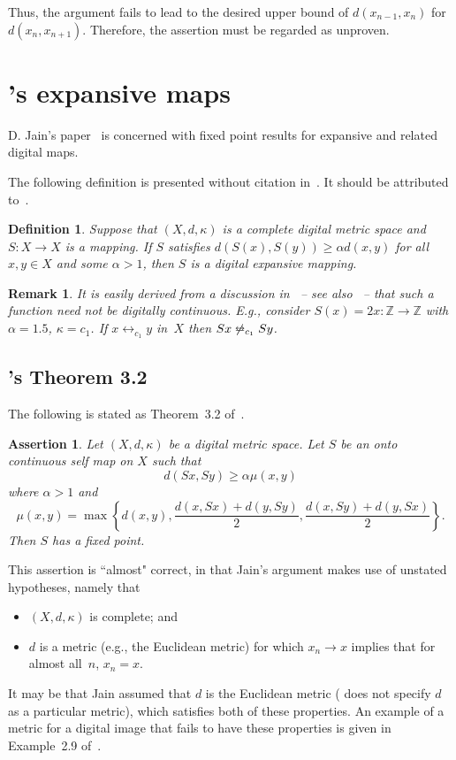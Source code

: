 \documentclass{article}
\newtheorem{assert}[thm]{Assertion}
\newtheorem{remarks}[thm]{Remark}
\newtheorem{definition}[thm]{Definition}
\numberwithin{thm}{section}
\newcommand{\adj}{\leftrightarrow}
\newcommand{\adjeq}{\leftrightarroweq}
\def\Z{{\mathbb Z}}
\begin{document}
Thus, the argument
fails to lead to the 
desired upper bound of
$d(x_{n-1},x_n)$
for $d(x_n,x_{n+1})$.
Therefore, the assertion
must be regarded as
unproven.

\section{\cite{Jain18}'s expansive maps}
D. Jain's paper~\cite{Jain18}
is concerned with
fixed point results
for expansive and
related digital maps.

The following definition is
presented without 
citation in~\cite{Jain18}. 
It should be attributed 
to~\cite{JyotiRani}.

\begin{definition}
    Suppose that $(X, d, \kappa)$ is a complete 
    digital metric space and 
    $S: X \to X$ is a mapping.
If $S$ satisfies 
$d(S(x), S(y)) \ge \alpha d(x, y)$ 
for all $x, y \in X$ and 
some $\alpha > 1$, 
then $S$ is a 
{\em digital expansive mapping}.
\end{definition}

\begin{remarks}
\label{discont}
It is easily derived
from a discussion
in~{\rm \cite{Rosenfeld}} -- see also~{\rm \cite{BxSt19}} --
that such a function
need not be 
digitally continuous. 
E.g., consider $S(x)=2x: \Z \to \Z$
with $\alpha = 1.5$,
$\kappa = c_1$. If
$x \adj_{c_1} y$ in~$X$
then $Sx \not \adjeq_{c_1} Sy$.
\end{remarks}

\subsection{\cite{Jain18}'s Theorem 3.2}
The following is
stated as Theorem~3.2
of~\cite{Jain18}.

\begin{assert}
\label{Jain3.2}
    Let $(X,d,\kappa)$
    be a digital metric space.
    Let $S$ be an
    onto continuous
    self map on $X$
    such that
    \[ d(Sx,Sy) \ge
    \alpha \mu(x,y)
    \]
    where $\alpha > 1$ and
    \[ \mu(x,y) =
    \max \left \{
    d(x,y), 
    \frac{d(x,Sx)+d(y,Sy)}{2},
    \frac{d(x,Sy)+d(y,Sx)}{2}
    \right \}.
    \]
    Then $S$ has a
    fixed point.
\end{assert}

This assertion is 
``almost" correct,
in that Jain's argument makes use of unstated
hypotheses, namely
that 
\begin{itemize}
    \item $(X,d,\kappa)$
is complete; and
\item $d$ is a metric (e.g., the
Euclidean metric) for which $x_n \to x$ implies that
for almost all~$n$,
$x_n = x$.
\end{itemize}
It may be that
Jain assumed that
$d$ is the Euclidean metric
(\cite{Jain18} 
does not specify $d$ as a particular metric), which satisfies
both of these
properties. An example of a metric
for a digital image
that fails to have
these properties is
given in Example~2.9
of~\cite{BxSt19}.
\end{document}
